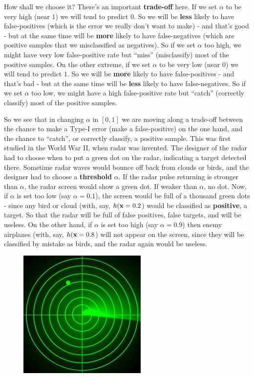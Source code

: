       How shall we choose it? There's an important {\bf trade-off} here. 
      If we set $\alpha$ to be very high (near $1$) we will tend to predict $0$. So we will be {\bf
      less}
      likely to have false-positives (which is the error we really don't want to
      make) - and that's good - but at the same time will be {\bf more} likely
      to have false-negatives (which are positive samples that we misclassified
      as negatives). So if we set $\alpha$ too high, we might have very low
      false-positive rate but ``miss'' (misclassify) most of the positive samples. 
      On the other extreme, if we set $\alpha$ to be very low (near $0$) we
      will tend to predict $1$. So we will be {\bf more} likely to have
      false-positives - and that's bad - but at the same time will be {\bf less}
    likely to have false-negatives. So if we set $\alpha$ too low, we might
    have a high false-positive rate but ``catch'' (correctly classify) most of
    the positive samples. 

    So we see that in changing $\alpha$ in $[0,1]$ we are moving along a
    trade-off between the chance to make a Type-I error (make a false-positive)
    on the one hand, and the chance to ``catch'', or correctly classify, a
    positive sample. This was first studied in the World War II, when radar was
    invented. The designer of the radar had to choose when to put a green dot on
    the radar, indicating a target detected there. Sometime radar waves would
    bounce off back from clouds or birds, and the designer had to choose a {\bf
    threshold} $\alpha$. If the radar pulse returning is stronger than
    $\alpha$, the radar screen would show a green dot. If weaker than $\alpha$,
    no dot. Now, if $\alpha$ is set too low (say $\alpha=0.1$), the screen would be full of a
    thousand green dots - since any bird or cloud (with, say, $h(\mathbf{x}=0.2$) would be classified as {\bf
      positive}, a target. So that the radar will be full of false positives,
      false targets, and will be useless. On the other hand, if $\alpha$ is set
      too high (say $\alpha=0.9$) then enemy airplanes  (with, say,
	$h(\mathbf{x}=0.8$) will not appear on the screen, since they will be
	classified by mistake as birds, and the radar again would
	be useless. 

	\begin{figure}[h!]
	  \centering
	  \includegraphics[width=2.5in]{radar.jpg}
	\end{figure}


